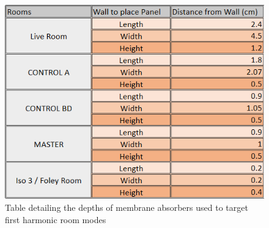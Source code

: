 \documentclass[10pt, twocolumn]{article}
\begin{document}
        \begin{figure}[H]
            \includegraphics[scale=0.7]{resources/membrane.png}
            \caption{Table detailing the depths of membrane absorbers used to target first harmonic room modes}
            \label{membranetable}
            \centering
        \end{figure}
\end{document}
